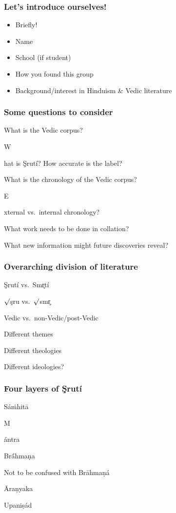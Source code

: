 \documentclass[pdf]{beamer}
\newcommand{\Subitem}[1]{{\setlength\itemindent{12pt} \item[-] #1}}
\begin{document}
\begin{frame} \frametitle{Let's introduce ourselves!}
\begin{itemize}
	\item Briefly!
	\item Name
	\item School (if student)
	\item How you found this group
	\item Background/interest in Hinduism \& Vedic literature
\end{itemize}
\end{frame}

\begin{frame}[label=questions] \frametitle{Some questions to consider}
\begin{itemize}
	\item What is the Vedic corpus?
	\Subitem What is Şrutí? How accurate is the label?
	\item What is the chronology of the Vedic corpus?
	\Subitem External vs.~internal chronology?
	\item What work needs to be done in collation?
	\item What new information might future discoveries reveal?
\end{itemize}
\end{frame}

\begin{frame} \frametitle{Overarching division of literature}
\begin{itemize}
	\item Şrutí vs.~Smr̥tí
	\Subitem {$\surd$şru vs.~$\surd$smr̥}
	\item Vedic vs.~non-Vedic/post-Vedic
	\item Different themes
	\item Different theologies
	\item Different ideologies?
\end{itemize}
\end{frame}

\begin{frame} \frametitle{Four layers of Şrutí}
\begin{itemize}
	\item Sáṁhitā
	\Subitem Mántra
	\item Brā́hmaṇa
	\item Not to be confused with Brāhmaṇá
	\item Āraṇyaka
	\item Upaniṣád
\end{itemize}
\end{frame}
\end{document}
